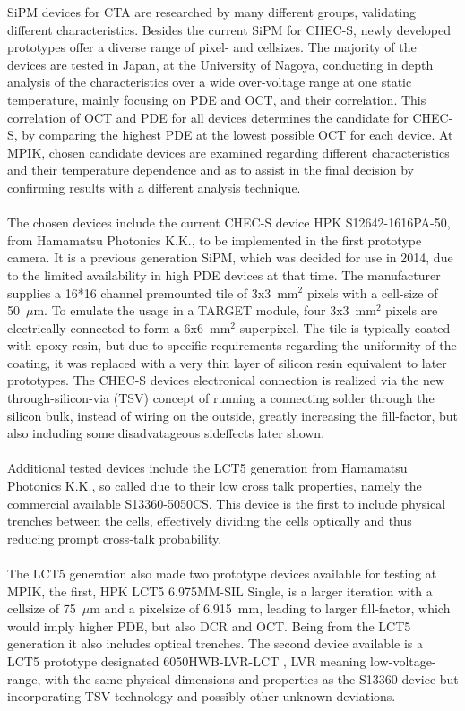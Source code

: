 \documentclass[12pt,article,type=msc,colorback,accentcolor=tud9c]{tudthesis}
\begin{document}
\noindent SiPM devices for CTA are researched by many different groups, validating different characteristics. Besides the current SiPM for CHEC-S, newly developed prototypes offer a diverse range of pixel- and cellsizes. The majority of the devices are tested in Japan, at the University of Nagoya, conducting in depth analysis of the characteristics over a wide over-voltage range at one static temperature, mainly focusing on PDE and OCT, and their correlation. This correlation of OCT and PDE for all devices determines the candidate for CHEC-S, by comparing the highest PDE at the lowest possible OCT for each device. At MPIK, chosen candidate devices are examined regarding different characteristics and their temperature dependence and as to assist in the final decision by confirming results with a different analysis technique.\\\\
The chosen devices include the current CHEC-S device HPK S12642-1616PA-50, from Hamamatsu Photonics K.K., to be implemented in the first prototype camera. It is a previous generation SiPM, which was decided for use in 2014, due to the limited availability in high PDE devices at that time. The manufacturer supplies a 16*16 channel premounted tile of 3x3~mm$^2$ pixels with a cell-size of 50~$\mu$m. To emulate the usage in a TARGET module, four 3x3~mm$^2$ pixels are electrically connected to form a 6x6~mm$^2$ superpixel. The tile is typically coated with epoxy resin, but due to specific requirements regarding the uniformity of the coating, it was replaced with a very thin layer of silicon resin equivalent to later prototypes. The CHEC-S devices electronical connection is realized via the new through-silicon-via (TSV) concept of running a connecting solder through the silicon bulk, instead of wiring on the outside, greatly increasing the fill-factor, but also including some disadvatageous sideffects later shown.\\\\
Additional tested devices include the LCT5 generation from Hamamatsu Photonics K.K., so called due to their low cross talk properties, namely the commercial available S13360-5050CS. This device is the first to include physical trenches between the cells, effectively dividing the cells optically and thus reducing prompt cross-talk probability.\\\\
The LCT5 generation also made two prototype devices available for testing at MPIK, the first, HPK LCT5 6.975MM-SIL Single, is a larger iteration with a cellsize of 75~$\mu$m and a pixelsize of 6.915~mm, leading to larger fill-factor, which would imply higher PDE, but also DCR and OCT. Being from the LCT5 generation it also includes optical trenches. The second device available is a LCT5 prototype designated 6050HWB-LVR-LCT , LVR meaning low-voltage-range, with the same physical dimensions and properties as the S13360 device but incorporating TSV technology and possibly other unknown deviations.\\\\
\end{document}
